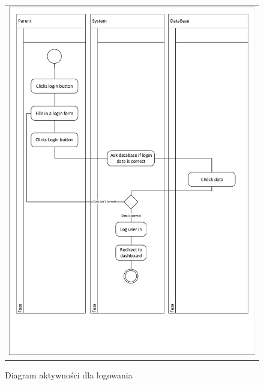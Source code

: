 \documentclass{sprawozdanie-agh}
\begin{document}
			\begin{figure}[H]
				\centering
				\begin{tabular}{c}
					\includegraphics[width=.95\textwidth]{Login} 
				\end{tabular}
			\caption{Diagram aktywności dla logowania}
			\end{figure}
\end{document}
